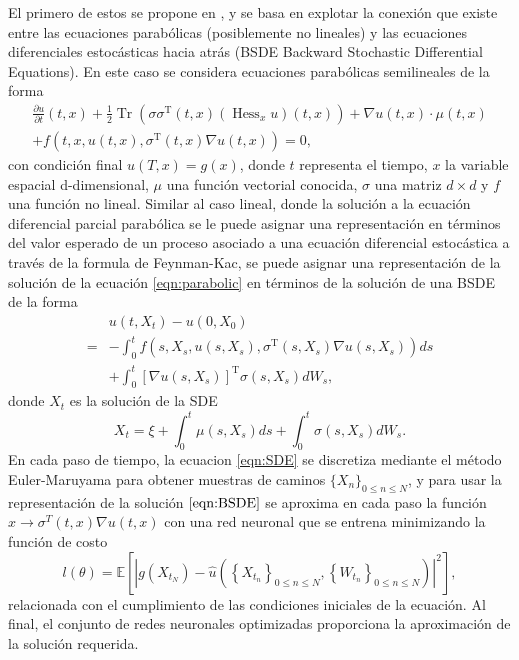 \documentclass[a4paper,11pt]{scrartcl}
\begin{document}
El primero de estos se propone en , y se basa en explotar la conexión que existe entre las ecuaciones parabólicas (posiblemente no lineales) y las ecuaciones diferenciales estocásticas hacia atrás (BSDE Backward Stochastic Differential Equations). En este caso se considera ecuaciones parabólicas semilineales de la forma
\begin{equation}
	\label{eqn:parabolic}
	\begin{gathered}
		\frac{\partial u}{\partial t}(t, x)+\frac{1}{2} \operatorname{Tr}\left(\sigma \sigma^{\mathrm{T}}(t, x)\left(\operatorname{Hess}_x u\right)(t, x)\right)+\nabla u(t, x) \cdot \mu(t, x) \\
		+f\left(t, x, u(t, x), \sigma^{\mathrm{T}}(t, x) \nabla u(t, x)\right)=0,
	\end{gathered}
\end{equation}
con condición final $u(T,x)=g(x)$, donde $t$ representa el tiempo, $x$ la variable espacial d-dimensional, $\mu $ una función vectorial conocida, $\sigma$ una matriz $d\times d$ y $f$ una función no lineal. Similar al caso lineal, donde la solución a la ecuación diferencial parcial parabólica se le puede asignar una representación en términos del valor esperado de un proceso asociado a una ecuación diferencial estocástica a través de la formula de Feynman-Kac, se puede asignar una representación de la solución de la ecuación \ref{eqn:parabolic} en términos de la solución de una BSDE de la forma
\begin{equation}
	\label{eqn:BSDE}
	\begin{aligned}
		& u\left(t, X_t\right)-u\left(0, X_0\right) \\
		=&-\int_0^t f\left(s, X_s, u\left(s, X_s\right), \sigma^{\mathrm{T}}\left(s, X_s\right) \nabla u\left(s, X_s\right)\right) d s \\
		&+\int_0^t\left[\nabla u\left(s, X_s\right)\right]^{\mathrm{T}} \sigma\left(s, X_s\right) d W_s ,
	\end{aligned}
\end{equation}
donde $X_t$ es la solución de la SDE
\begin{equation}
	\label{eqn:SDE}
	X_t=\xi+\int_0^t \mu\left(s, X_s\right) d s+\int_0^t \sigma\left(s, X_s\right) d W_s.
\end{equation}
En cada paso de tiempo, la ecuacion \ref{eqn:SDE} se discretiza mediante el método Euler-Maruyama para obtener muestras de caminos $\{ X_n\}_{0\leq n \leq N}$, y para usar la representación de la solución $\ref{eqn:BSDE}$ se aproxima en cada paso la función $x\to \sigma^{T}(t,x)\nabla u(t,x)$ con una red neuronal que se entrena minimizando la función de costo
\begin{equation}
	l(\theta)=\mathbb{E}\left[\left|g\left(X_{t_N}\right)-\hat{u}\left(\left\{X_{t_n}\right\}_{0 \leq n \leq N},\left\{W_{t_n}\right\}_{0 \leq n \leq N}\right)\right|^2\right],
\end{equation}	
relacionada con el cumplimiento de las condiciones iniciales de la ecuación. Al final, el conjunto de redes neuronales optimizadas proporciona la aproximación de la solución requerida.\\
\end{document}
